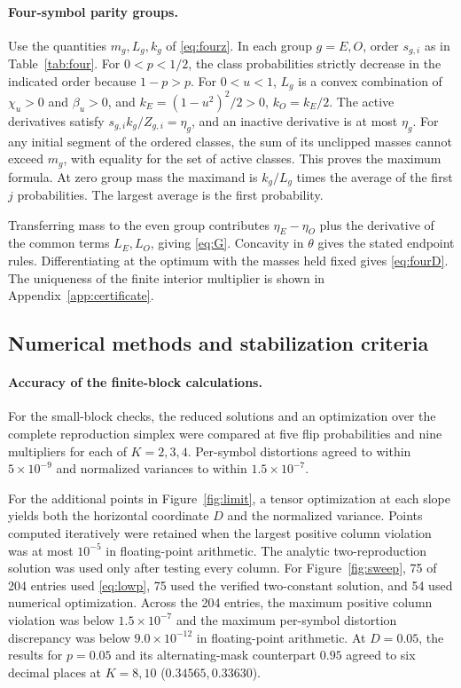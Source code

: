 \documentclass[11pt,letterpaper]{article}
\theoremstyle{definition}
\begin{document}
\paragraph{Four-symbol parity groups.}
Use the quantities $m_g,L_g,k_g$ of \eqref{eq:fourz}. In each group $g=E,O$, order $s_{g,i}$ as in Table~\ref{tab:four}. For $0<p<1/2$, the class probabilities strictly decrease in the indicated order because $1-p>p$. For $0<u<1$, $L_g$ is a convex combination of $\chi_u>0$ and $\beta_u>0$, and $k_E=(1-u^2)^2/2>0$, $k_O=k_E/2$. The active derivatives satisfy $s_{g,i} k_g/Z_{g,i}=\eta_g$, and an inactive derivative is at most $\eta_g$. For any initial segment of the ordered classes, the sum of its unclipped masses cannot exceed $m_g$, with equality for the set of active classes. This proves the maximum formula. At zero group mass the maximand is $k_g/L_g$ times the average of the first $j$ probabilities. The largest average is the first probability.

Transferring mass to the even group contributes $\eta_E-\eta_O$ plus the derivative of the common terms $L_E,L_O$, giving \eqref{eq:G}. Concavity in $\theta$ gives the stated endpoint rules. Differentiating at the optimum with the masses held fixed gives \eqref{eq:fourD}. The uniqueness of the finite interior multiplier is shown in Appendix~\ref{app:certificate}.
\subsection{Numerical methods and stabilization criteria}\label{app:data}
\paragraph{Accuracy of the finite-block calculations.}
For the small-block checks, the reduced solutions and an optimization over the complete reproduction simplex were compared at five flip probabilities and nine multipliers for each of $K=2,3,4$. Per-symbol distortions agreed to within $5\times10^{-9}$ and normalized variances to within $1.5\times10^{-7}$.

For the additional points in Figure~\ref{fig:limit}, a tensor optimization at each slope yields both the horizontal coordinate $D$ and the normalized variance. Points computed iteratively were retained when the largest positive column violation was at most $10^{-5}$ in floating-point arithmetic. The analytic two-reproduction solution was used only after testing every column. For Figure~\ref{fig:sweep}, 75 of 204 entries used \eqref{eq:lowp}, 75 used the verified two-constant solution, and 54 used numerical optimization. Across the 204 entries, the maximum positive column violation was below $1.5\times10^{-7}$ and the maximum per-symbol distortion discrepancy was below $9.0\times10^{-12}$ in floating-point arithmetic. At $D=0.05$, the results for $p=0.05$ and its alternating-mask counterpart $0.95$ agreed to six decimal places at $K=8,10$ ($0.34565,0.33630$).
\end{document}
